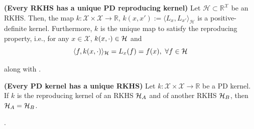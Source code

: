 \begin{proposition}
	\label{prop.unique_reprod_kernel}
	\textbf{(Every RKHS has a unique PD reproducing kernel)} 
	Let $\mathcal{H} \subset \mathbb{R}^\mathcal{X}$ be an RKHS. Then, the map $k: \mathcal{X} \times \mathcal{X} \rightarrow \mathbb{R}$, $k(x,x') := \langle L_x, L_{x'} \rangle_\mathcal{H}$ is a positive-definite kernel. Furthermore, $k$ is the unique map to satisfy the reproducing property, i.e., for any $x \in \mathcal{X}$, $k(x,\cdot) \in \mathcal{H}$ and
	\begin{equation}
		\rkinner{f}{k(x,\cdot)} = L_x(f) = f(x), \ \forall f \in \rkhs
		\label{eq.reproducing_property}
	\end{equation} 
\end{proposition}

\begin{my_proof}
	 \cite[Lemma~2]{berlinet2011reproducing} along with \citep[Theorem~4.20]{steinwart2008svm_book}.
\end{my_proof}

\begin{proposition}
	\label{prop.unique_rkhs}
	\textbf{(Every PD kernel has a unique RKHS)} 
	Let $k: \mathcal{X} \times \mathcal{X} \rightarrow \mathbb{R}$ be a PD kernel. If $k$ is the reproducing kernel of an RKHS $\mathcal{H}_A$ and of another RKHS $\mathcal{H}_B$, then $\mathcal{H}_A = \mathcal{H}_B$.
\end{proposition}

\begin{my_proof}
	\citep[Theorem~4.21]{steinwart2008svm_book}.
\end{my_proof}

